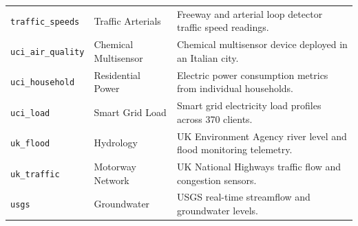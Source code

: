 \documentclass[10pt,a4paper]{report}
\begin{document}
\begin{table}[htbp]
\begin{tabularx}{\textwidth}{llX}
\texttt{traffic\_speeds} & Traffic Arterials & Freeway and arterial loop detector traffic speed readings. \\
\texttt{uci\_air\_quality} & Chemical Multisensor & Chemical multisensor device deployed in an Italian city. \\
\texttt{uci\_household} & Residential Power & Electric power consumption metrics from individual households. \\
\texttt{uci\_load} & Smart Grid Load & Smart grid electricity load profiles across 370 clients. \\
\texttt{uk\_flood} & Hydrology & UK Environment Agency river level and flood monitoring telemetry. \\
\texttt{uk\_traffic} & Motorway Network & UK National Highways traffic flow and congestion sensors. \\
\texttt{usgs} & Groundwater & USGS real-time streamflow and groundwater levels. \\
\bottomrule
\end{tabularx}
\end{table}
\end{document}
